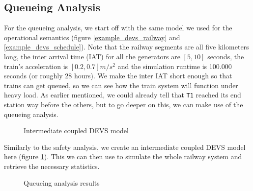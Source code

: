 \documentclass{article}
\begin{document}
\subsection*{Queueing Analysis}
\label{queueing_analysis_section}

For the queueing analysis, we start off with the same model we used for the operational semantics (figure \ref{example_devs_railway} and \ref{example_devs_schedule}). Note that the railway segments are all five kilometers long, the inter arrival time (IAT) for all the generators are $[5,10]$ seconds, the train's acceleration is $[0.2,0.7] m/s^2$ and the simulation runtime is 100.000 seconds (or roughly 28 hours). We make the inter IAT short enough so that trains can get queued, so we can see how the train system will function under heavy load. As earlier mentioned, we could already tell that \texttt{T1} reached its end station way before the others, but to go deeper on this, we can make use of the queueing analysis.

\begin{figure}[H]
    \begin{center}
    \end{center}
    \caption{Intermediate coupled DEVS model}
    \label{example_devs_devs}
\end{figure}

Similarly to the safety analysis, we create an intermediate coupled DEVS model here (figure \ref{example_devs_devs}). This we can then use to simulate the whole railway system and retrieve the necessary statistics.

\begin{figure}[H]
    \begin{center}
    \end{center}
    \caption{Queueing analysis results}
    \label{example_devs_results}
\end{figure}
\end{document}
